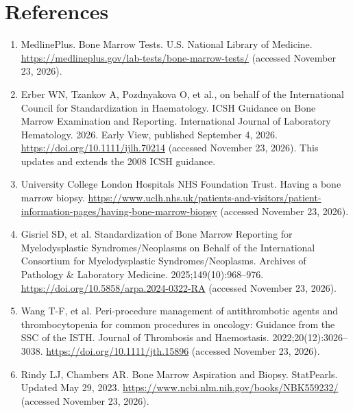 \section*{References}
\begin{enumerate}
  \item MedlinePlus. Bone Marrow Tests. U.S. National Library of Medicine. \url{https://medlineplus.gov/lab-tests/bone-marrow-tests/} (accessed November 23, 2026).
  \item Erber WN, Tzankov A, Pozdnyakova O, et al., on behalf of the International Council for Standardization in Haematology. ICSH Guidance on Bone Marrow Examination and Reporting. International Journal of Laboratory Hematology. 2026. Early View, published September 4, 2026. \url{https://doi.org/10.1111/ijlh.70214} (accessed November 23, 2026). This updates and extends the 2008 ICSH guidance.
  \item University College London Hospitals NHS Foundation Trust. Having a bone marrow biopsy. \url{https://www.uclh.nhs.uk/patients-and-visitors/patient-information-pages/having-bone-marrow-biopsy} (accessed November 23, 2026).
  \item Gisriel SD, et al. Standardization of Bone Marrow Reporting for Myelodysplastic Syndromes/Neoplasms on Behalf of the International Consortium for Myelodysplastic Syndromes/Neoplasms. Archives of Pathology \& Laboratory Medicine. 2025;149(10):968--976. \url{https://doi.org/10.5858/arpa.2024-0322-RA} (accessed November 23, 2026).
  \item Wang T-F, et al. Peri-procedure management of antithrombotic agents and thrombocytopenia for common procedures in oncology: Guidance from the SSC of the ISTH. Journal of Thrombosis and Haemostasis. 2022;20(12):3026--3038. \url{https://doi.org/10.1111/jth.15896} (accessed November 23, 2026).
  \item Rindy LJ, Chambers AR. Bone Marrow Aspiration and Biopsy. StatPearls. Updated May 29, 2023. \url{https://www.ncbi.nlm.nih.gov/books/NBK559232/} (accessed November 23, 2026).
\end{enumerate}

\clearpage
